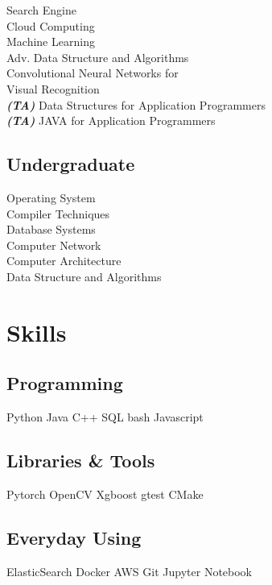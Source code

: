 \documentclass[letterpaper]{deedy-resume} %
\begin{document}
\begin{minipage}[t]{0.33\textwidth}
Search Engine \\
Cloud Computing \\
Machine Learning \\
Adv. Data Structure and Algorithms \\
Convolutional Neural Networks for \\
Visual Recognition \\

{\footnotesize \textit{\textbf{(TA) }}} Data Structures for Application Programmers \\
{\footnotesize \textit{\textbf{(TA) }}} JAVA for Application Programmers

\sectionspace %


\subsection{Undergraduate}

Operating System \\
Compiler Techniques \\
Database Systems \\
Computer Network \\
Computer Architecture \\
Data Structure and Algorithms \\

\sectionspace %


\section{Skills}

\subsection{Programming}
Python \textbullet{} Java \textbullet{} C++  \textbullet{} SQL \textbullet{} bash \textbullet{} Javascript
\sectionspace 
\subsection{Libraries \& Tools}
Pytorch \textbullet{} OpenCV \textbullet{} Xgboost \textbullet{} gtest \textbullet{} CMake
\sectionspace
\subsection{Everyday Using}
ElasticSearch \textbullet{} Docker \textbullet{} AWS \textbullet{} Git \textbullet{} Jupyter Notebook 

\sectionspace %


\end{minipage} %
\end{document}
